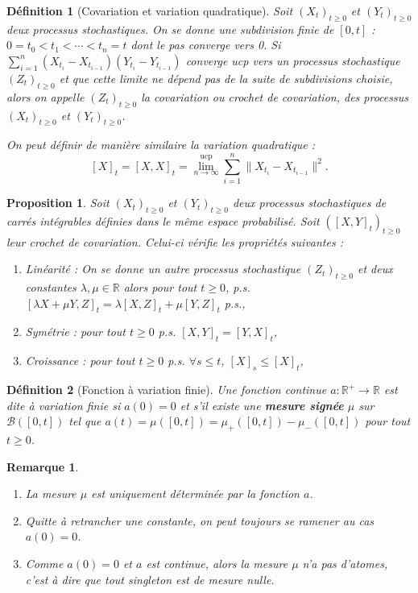 \documentclass[openany]{book}
\newcommand{\R}{\mathbb{R}}
\newcommand{\1}{\mathbbm{1}}
\theoremstyle{thmfont}
\theoremstyle{deffont}
\newtheorem{definition}[definition]{Définition}
\theoremstyle{thmfont}
\newtheorem{prop}[prop]{Proposition}
\theoremstyle{deffont}
\newtheorem{remark}[remark]{Remarque}
\begin{document}
\begin{definition}[Covariation et variation quadratique] Soit $(X_t)_{t\geq0}$ et $(Y_t)_{t\geq0}$ deux processus stochastiques. 
  On se donne une subdivision finie de $[0,t]$ : $0 = t_0 < t_1 < \cdots < t_n = t$ dont le pas converge vers 0. Si $\sum_{i = 1}^n(X_{t_i} - X_{t_{i-1}})(Y_{t_i} - Y_{t_{i-1}})$ converge ucp vers un processus stochastique $(Z_t)_{t\geq0}$ et que cette limite ne dépend pas de la suite de subdivisions choisie, alors on appelle $(Z_t)_{t\geq0}$ la \textit{covariation} ou \textit{crochet de covariation}, des processus $(X_t)_{t\geq0}$ et $(Y_t)_{t\geq0}$.

 \noindent On peut définir de manière similaire la \textit{variation quadratique} :
 $$[X]_t = [X,X]_t = \lim_{n\to \infty}^{\text{ucp}} \sum_{i = 1}^n\|X_{t_i} - X_{t_{i-1}}\|^2.$$
\label{def:crochet}
\end{definition}


\begin{prop} Soit $(X_t)_{t\geq0}$ et $(Y_t)_{t\geq0}$ deux processus stochastiques de carrés intégrables définies dans le même espace probabilisé. Soit $([X,Y]_t)_{t\geq0}$ leur crochet de covariation. Celui-ci vérifie les propriétés suivantes : 
  \begin{enumerate}
  \item Linéarité : On se donne un autre processus stochastique $(Z_t)_{t\geq0}$ et deux constantes $\lambda, \mu \in \R$ alors pour tout $t\geq0$, p.s. $[\lambda X + \mu Y, Z]_t = \lambda[X,Z]_t + \mu[Y,Z]_t$ p.s.,
  \item Symétrie : pour tout $t\geq0$ p.s. $[X,Y]_t = [Y,X]_t$,
  \item Croissance : pour tout $t\geq0$ p.s. $\forall s\leq t$, $[X]_s \leq [X]_t$,
  \end{enumerate}
\end{prop}

\begin{definition}[Fonction à variation finie] Une fonction continue $a : \R^+ \rightarrow \R$ est dite \textit{à variation finie} si $a(0) = 0$ et s'il existe une \textbf{mesure
    signée} $\mu$ sur $\mathcal B([0,t])$ tel que $a(t) = \mu([0,t]) = \mu_+([0,t]) - \mu_-([0,t])$ pour tout $t \geq 0$.
\label{def:fct_var_finie}
\end{definition}

\begin{remark}
  \begin{enumerate}
  \item La mesure $\mu$ est uniquement déterminée par la fonction $a$.
  \item Quitte à retrancher une constante, on peut toujours se ramener au cas $a(0) = 0$.
  \item Comme $a(0) = 0$ et $a$ est continue, alors la mesure $\mu$ n'a pas d'\textit{atomes}, c'est à dire que tout singleton est de mesure nulle.
  \end{enumerate}
\end{remark}
\end{document}

